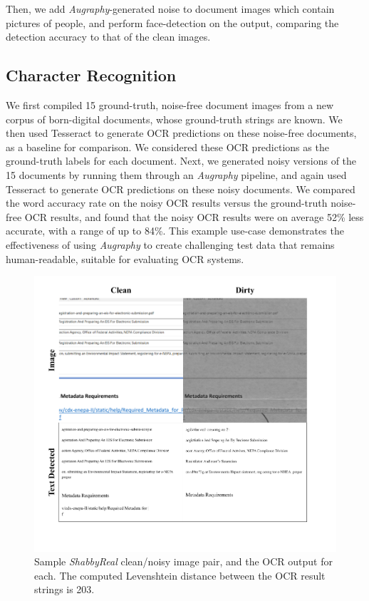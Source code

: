 \documentclass[runningheads]{llncs}
\begin{document}
Then, we add \emph{Augraphy}-generated noise to document images which contain pictures of people, and perform face-detection on the output, comparing the detection accuracy to that of the clean images.

\subsection{Character Recognition}
We first compiled 15 ground-truth, noise-free document images from a new corpus of born-digital documents, whose ground-truth strings are known. We then used Tesseract to generate OCR predictions on these noise-free documents, as a baseline for comparison. We considered these OCR predictions as the ground-truth labels for each document. Next, we generated noisy versions of the 15 documents by running them through an \emph{Augraphy} pipeline, and again used Tesseract to generate OCR predictions on these noisy documents. We compared the word accuracy rate on the noisy OCR results versus the ground-truth noise-free OCR results, and found that the noisy OCR results were on average 52\% less accurate, with a range of up to 84\%. This example use-case demonstrates the effectiveness of using \emph{Augraphy} to create challenging test data that remains human-readable, suitable for evaluating OCR systems.

\begin{figure}
\centering
\includegraphics[width=0.9\columnwidth]{figures/ocr_figure.png}
\caption{Sample \emph{ShabbyReal} clean/noisy image pair, and the OCR output for each. The computed Levenshtein distance between the OCR result strings is 203.}
\label{fig:ocr_output}
\end{figure}
\end{document}
